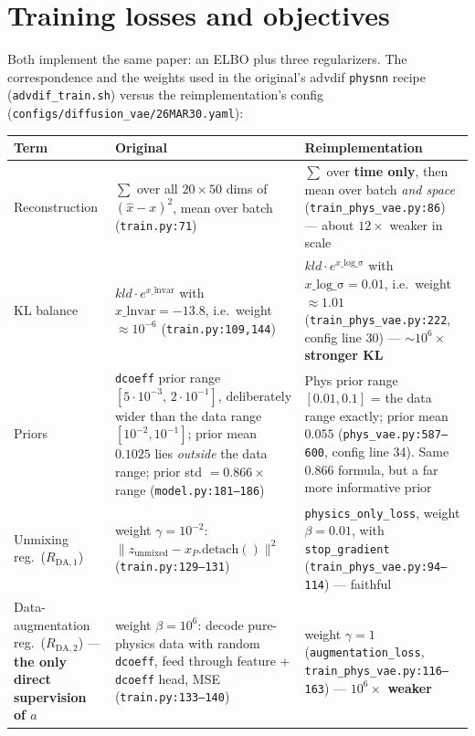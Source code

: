 \documentclass[11pt,a4paper]{article}
\newcommand{\code}[1]{\texttt{#1}}
\begin{document}
\section{Training losses and objectives}
\label{sec:losses}

Both implement the same paper: an ELBO plus three regularizers. The correspondence and
the weights used in the original's advdif \code{physnn} recipe (\code{advdif\_train.sh})
versus the reimplementation's config (\code{configs/diffusion\_vae/26MAR30.yaml}):

\begin{table}[h]
\centering
\small
\begin{tabularx}{\textwidth}{LXX}
\toprule
\textbf{Term} & \textbf{Original} & \textbf{Reimplementation} \\
\midrule
Reconstruction & $\sum$ over all $20\times50$ dims of $(\hat{x}-x)^2$, mean over batch (\code{train.py:71}) & $\sum$ over \textbf{time only}, then mean over batch \emph{and space} (\code{train\_phys\_vae.py:86}) --- about $12\times$ weaker in scale \\
KL balance & $kld \cdot e^{x\_\mathrm{lnvar}}$ with $x\_\mathrm{lnvar} = -13.8$, i.e.\ weight $\approx 10^{-6}$ (\code{train.py:109,144}) & $kld \cdot e^{x\_\mathrm{log\_\sigma}}$ with $x\_\mathrm{log\_\sigma} = 0.01$, i.e.\ weight $\approx 1.01$ (\code{train\_phys\_vae.py:222}, config line 30) --- \textbf{$\sim10^6\times$ stronger KL} \\
Priors & \code{dcoeff} prior range $[5\cdot10^{-3},\,2\cdot10^{-1}]$, deliberately wider than the data range $[10^{-2},10^{-1}]$; prior mean $0.1025$ lies \emph{outside} the data range; prior std $=0.866\times$ range (\code{model.py:181--186}) & Phys prior range $[0.01, 0.1]$ = the data range exactly; prior mean $0.055$ (\code{phys\_vae.py:587--600}, config line 34). Same $0.866$ formula, but a far more informative prior \\
Unmixing reg.\ ($R_{\mathrm{DA},1}$) & weight $\gamma = 10^{-2}$: $\|z_\mathrm{unmixed} - x_P.\mathrm{detach}()\|^2$ (\code{train.py:129--131}) & \code{physics\_only\_loss}, weight $\beta = 0.01$, with \code{stop\_gradient} (\code{train\_phys\_vae.py:94--114}) --- faithful \\
Data-augmentation reg.\ ($R_{\mathrm{DA},2}$) --- \textbf{the only direct supervision of $a$} & weight $\beta = 10^{6}$: decode pure-physics data with random \code{dcoeff}, feed through feature + \code{dcoeff} head, MSE (\code{train.py:133--140}) & weight $\gamma = 1$ (\code{augmentation\_loss}, \code{train\_phys\_vae.py:116--163}) --- \textbf{$10^6\times$ weaker} \\

\end{tabularx}
\end{table}
\end{document}
